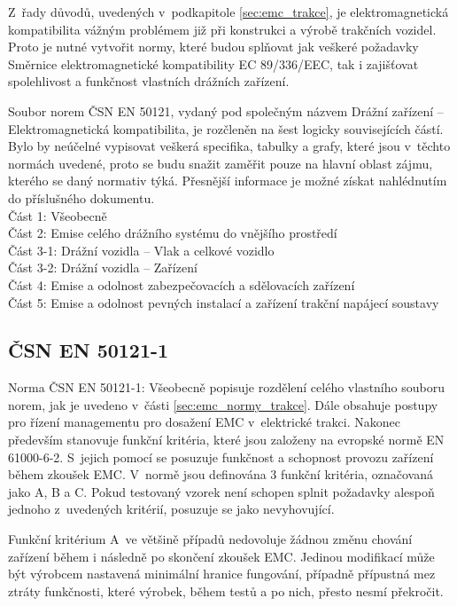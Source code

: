  Z~řady důvodů, uvedených v~podkapitole \ref{sec:emc_trakce},  je elektromagnetická kompatibilita vážným problémem již při konstrukci a výrobě trakčních vozidel. Proto je nutné vytvořit normy, které budou splňovat jak veškeré požadavky Směrnice elektromagnetické kompatibility EC 89/336/EEC, tak i zajišťovat spolehlivost a funkčnost vlastních drážních zařízení.

Soubor norem ČSN EN 50121, vydaný pod společným názvem Drážní zařízení – Elektromagnetická kompatibilita, je rozčleněn na šest logicky souvisejících částí. Bylo by neúčelné vypisovat veškerá specifika, tabulky a grafy, které jsou v~těchto normách uvedené, proto se budu snažit zaměřit pouze na hlavní oblast zájmu, kterého se daný normativ týká. Přesnější informace je možné získat nahlédnutím do příslušného dokumentu. \bigskip \\
Část 1: Všeobecně\\
Část 2: Emise celého drážního  systému do vnějšího prostředí\\
Část 3-1: Drážní vozidla – Vlak a celkové vozidlo\\
Část 3-2: Drážní vozidla – Zařízení\\
Část 4: Emise a odolnost zabezpečovacích a sdělovacích zařízení\\
Část 5: Emise a odolnost pevných instalací a zařízení trakční napájecí soustavy\\

\subsection{ČSN EN 50121-1}
Norma ČSN EN 50121-1: Všeobecně popisuje rozdělení celého vlastního souboru norem, jak je uvedeno v~části \ref{sec:emc_normy_trakce}. Dále obsahuje postupy pro řízení managementu pro dosažení EMC v~elektrické trakci. Nakonec především stanovuje funkční kritéria, které jsou založeny na evropské normě EN 61000-6-2. S~jejich pomocí se posuzuje funkčnost a schopnost provozu zařízení během zkoušek EMC. V~normě jsou definována 3 funkční kritéria, označovaná jako A, B a C. Pokud testovaný vzorek není schopen splnit požadavky alespoň jednoho z~uvedených kritérií, posuzuje se jako nevyhovující.

Funkční kritérium A~ve většině případů nedovoluje žádnou změnu chování zařízení během i následně po skončení zkoušek EMC. Jedinou modifikací může být výrobcem nastavená minimální hranice fungování, případně přípustná mez ztráty funkčnosti, které výrobek, během testů a po nich, přesto nesmí překročit.

